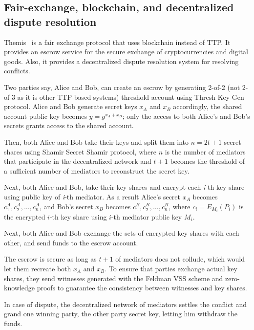 \subsection{Fair-exchange, blockchain, and decentralized dispute resolution}
\label{themis-towards-decentralized-escrow-of-cryptocurrencies-without-trusted-third-parties}

Themis~\cite{mengThemisDecentralizedEscrow2019} is a fair exchange protocol that uses blockchain instead of TTP. It provides an escrow service for the secure exchange of cryptocurrencies and digital goods. Also, it provides a decentralized dispute resolution system for resolving conflicts.

Two parties say, Alice and Bob, can create an escrow by generating
2-of-2 (not 2-of-3 as it is other TTP-based systems) threshold account
using Thresh-Key-Gen protocol. Alice and Bob generate secret keys
\(x_A\) and \(x_B\) accordingly, the shared account public key becomes
\(y = g^{x_A+x_B}\); only the access to both Alice's and Bob's secrets
grants access to the shared account.

Then, both Alice and Bob take their keys and split them into
\(n=2t+1\) secret shares using Shamir Secret Shamir protocol, where
\(n\) is the number of mediators that participate in the decentralized
network and \(t+1\) becomes the threshold of a sufficient number of mediators to reconstruct the secret key.

Next, both Alice and Bob, take their key shares and encrypt each
\textit{i}-th key share using public key of \textit{i}-th mediator. As a result
Alice's secret \(x_A\) becomes \({c^A_1, c^A_2,...,c^A_n}\), and Bob's
secret \(x_B\) becomes \({c^B_1, c^B_2,...,c^B_n}\), where
\(c_i = E_{M_i}(P_i)\) is the encrypted \(i\)-th key share using
\(i\)-th mediator public key \(M_i\).

Next, both Alice and Bob exchange the sets of encrypted key shares with
each other, and send funds to the escrow account.

The escrow is secure as long as \(t+1\) of mediators does not collude,
which would let them recreate both \(x_A\) and \(x_B\). To ensure
that parties exchange actual key shares, they send witnesses
generated with the Feldman VSS scheme and zero-knowledge proofs to guarantee the consistency between witnesses and key shares.

In case of dispute, the decentralized network of mediators settles the conflict and grand one winning party, the other party secret key,
letting him withdraw the funds.

